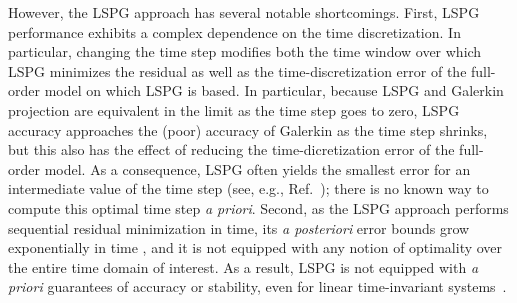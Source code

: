 \documentclass[3p,computermodern,10pt]{elsarticle}
\begin{document}
However, the LSPG approach has several notable shortcomings. First, LSPG
performance exhibits a complex dependence on the time discretization. In
particular, changing
the time step modifies both the
time window over which LSPG minimizes the residual as well as the
time-discretization error of the full-order model on which LSPG is based. 
In particular, because LSPG and Galerkin projection are equivalent in the
limit as the time step goes to zero, LSPG accuracy approaches the (poor)
accuracy of Galerkin as the time step shrinks, but this also has the effect of
reducing the time-dicretization error of the full-order model.
As a
consequence, LSPG often yields the smallest error for an intermediate value of the
time step (see, e.g., Ref.~\cite[Figure 9]{carlberg_lspg_v_galerkin}); there
is no known way to compute this optimal time step \textit{a priori}.
Second, as the LSPG approach performs sequential residual minimization in
time, its \textit{a posteriori} error bounds grow exponentially in time
\cite{carlberg_lspg_v_galerkin}, and it is not equipped with any notion of
optimality over the entire time domain of interest. As a result, LSPG is not
equipped with \textit{a priori} guarantees of accuracy or stability, even for
linear time-invariant systems~\cite{bui_thesis}.
\end{document}
